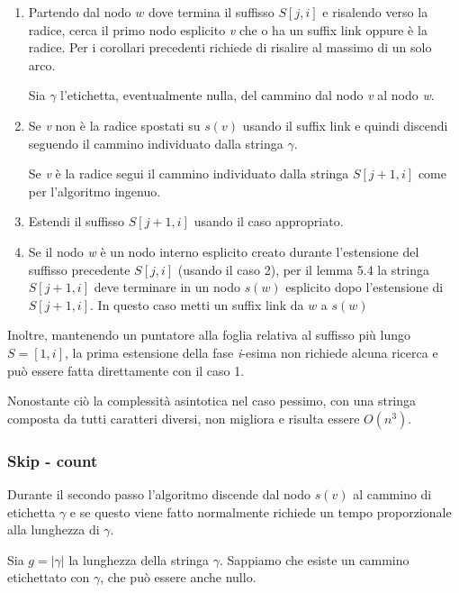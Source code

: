 \begin{enumerate}
	\item Partendo dal nodo $ w $ dove termina il suffisso $ S[j,i] $ e risalendo verso la radice, cerca il primo nodo esplicito \textit{v} che o ha un suffix link oppure è la radice. Per i corollari precedenti richiede di risalire al massimo di un solo arco.
	
	Sia $\gamma$ l'etichetta, eventualmente nulla, del cammino dal nodo \textit{v} al nodo \textit{w}.
	
	\item Se \textit{v} non è la radice spostati su  $s(v)$ usando il suffix link e quindi discendi seguendo il cammino individuato dalla stringa $ \gamma $.
	
	Se \textit{v} è la radice segui il cammino individuato dalla stringa $ S[j+1,i] $ come per l'algoritmo ingenuo.
	
	\item Estendi il suffisso $ S[j+1,i] $ usando il caso appropriato.
	
	\item Se il nodo \textit{w} è un nodo interno esplicito creato durante l'estensione del suffisso precedente $S[j,i]$ (usando il caso 2), per il lemma 5.4 la stringa $ S[j+1,i] $ deve terminare in un nodo $ s(w) $ esplicito dopo l'estensione di $ S[j+1,i] $. In questo caso metti un suffix link da $ w $ a $ s(w) $
\end{enumerate}

Inoltre, mantenendo un puntatore alla foglia relativa al suffisso più lungo $ S=[1,i] $, la prima estensione della fase \textit{i}-esima non richiede alcuna ricerca e può essere fatta direttamente con il caso 1.

Nonostante ciò la complessità asintotica nel caso pessimo, con una stringa composta da tutti caratteri diversi, non migliora e risulta essere $ O(n^3) $.

\subsubsection{Skip - count}

Durante il secondo passo l'algoritmo discende dal nodo $s(v)$ al cammino di etichetta $\gamma$ e se questo viene fatto normalmente richiede un tempo proporzionale alla lunghezza di $\gamma$.

Sia $g = |\gamma|$ la lunghezza della stringa $\gamma$. Sappiamo che esiste un cammino etichettato con $\gamma$, che può essere anche nullo.

